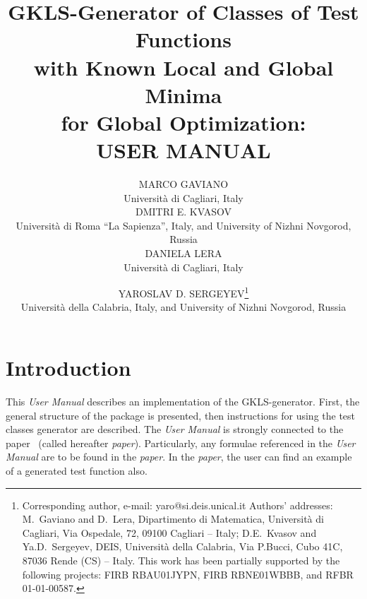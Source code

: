 \documentclass[acmtoms]{acmtrans2m}
\begin{document}

\title{GKLS-Generator of Classes of Test Functions\\
with Known Local and Global Minima\\for Global Optimization:\\
USER MANUAL}

\author{MARCO GAVIANO \\ Universit\`{a} di Cagliari, Italy
 \\ DMITRI E. KVASOV \\ Universit\`{a} di Roma ``La Sapienza'',
 Italy, and University of Nizhni Novgorod, Russia
 \\ DANIELA LERA \\ Universit\`{a} di Cagliari, Italy
 \and YAROSLAV D. SERGEYEV\footnote{Corresponding author, e-mail:
 yaro@si.deis.unical.it \newline
 Authors' addresses: M.~Gaviano and D.~Lera, Dipartimento
 di Matematica, Universit\`{a} di Cagliari, Via Ospedale, 72, 09100
 Cagliari -- Italy; D.E.~Kvasov and Ya.D.~Sergeyev, DEIS,
 Universit\`a della Calabria, Via P.Bucci, Cubo 41C, 87036 Rende
 (CS) -- Italy. \newline
 This work has been partially supported by the following projects:
 FIRB RBAU01JYPN, FIRB RBNE01WBBB, and RFBR 01-01-00587.}
 \\ Universit\`{a} della Calabria, Italy,
and University of Nizhni Novgorod, Russia}

\maketitle

\setcounter{page}{0}

\vspace{4mm} \tableofcontents
\newpage

\section{Introduction} \label{sectionIntro}

This {\it User Manual} describes an implementation of the
GKLS-generator. First, the general structure of the package is
presented, then instructions for using the test classes generator
are described. The {\it User Manual} is strongly connected to the
paper~ (called hereafter {\it paper}).
Particularly, any formulae referenced in the {\it User Manual} are
to be found in the {\it paper}. In the {\it paper}, the user can
find an example of a generated test function also.
\end{document}
